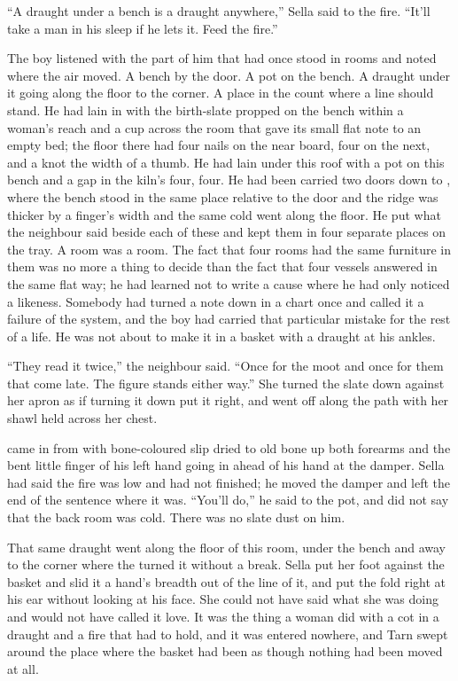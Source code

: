 “A draught under a bench is a draught anywhere,” Sella said to the fire. “It'll take a man in his sleep if he lets it. Feed the fire.”

The boy listened with the part of him that had once stood in rooms and noted where the air moved. A bench by the door. A pot on the bench. A draught under it going along the floor to the corner. A place in the count where a line should stand. He had lain in  with the birth-slate propped on the bench within a woman's reach and a cup across the room that gave its small flat note to an empty bed; the floor there had four nails on the near board, four on the next, and a knot the width of a thumb. He had lain under this roof with a pot on this bench and a gap in the kiln's four, four. He had been carried two doors down to , where the bench stood in the same place relative to the door and the ridge was thicker by a finger's width and the same cold went along the floor. He put what the neighbour said beside each of these and kept them in four separate places on the tray. A room was a room. The fact that four rooms had the same furniture in them was no more a thing to decide than the fact that four vessels answered in the same flat way; he had learned not to write a cause where he had only noticed a likeness. Somebody had turned a note down in a chart once and called it a failure of the system, and the boy had carried that particular mistake for the rest of a life. He was not about to make it in a basket with a draught at his ankles.

“They read it twice,” the neighbour said. “Once for the moot and once for them that come late. The figure stands either way.” She turned the slate down against her apron as if turning it down put it right, and went off along the path with her shawl held across her chest.

 came in from  with bone-coloured slip dried to old bone up both forearms and the bent little finger of his left hand going in ahead of his hand at the damper. Sella had said the fire was low and had not finished; he moved the damper and left the end of the sentence where it was. “You'll do,” he said to the pot, and did not say that the back room was cold. There was no slate dust on him.

That same draught went along the floor of this room, under the bench and away to the corner where the  turned it without a break. Sella put her foot against the basket and slid it a hand's breadth out of the line of it, and put the fold right at his ear without looking at his face. She could not have said what she was doing and would not have called it love. It was the thing a woman did with a cot in a draught and a fire that had to hold, and it was entered nowhere, and Tarn swept around the place where the basket had been as though nothing had been moved at all.

